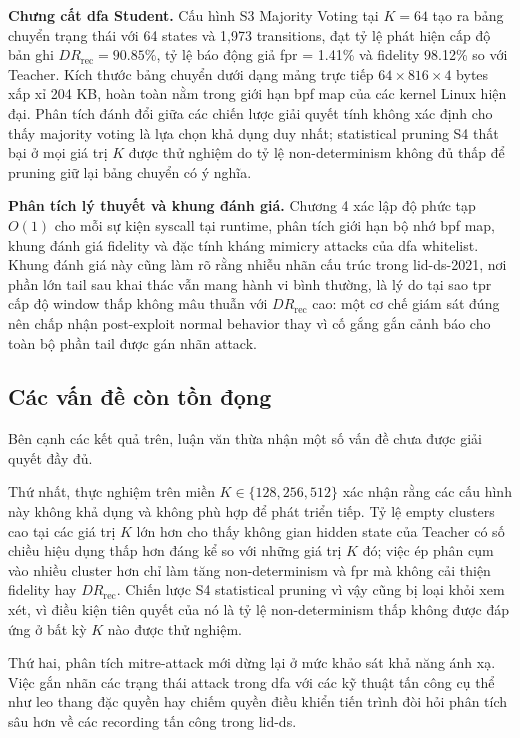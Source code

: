 \documentclass[../main.tex]{subfiles}
\begin{document}
\textbf{Chưng cất \gls{dfa} Student.} Cấu hình S3 Majority Voting tại $K = 64$ tạo ra bảng
chuyển trạng thái với 64 states và 1,973 transitions, đạt tỷ lệ phát hiện cấp độ bản ghi
$DR_{\text{rec}} = 90.85\%$, tỷ lệ báo động giả \gls{fpr} = 1.41\% và fidelity 98.12\% so với
Teacher. Kích thước bảng chuyển dưới dạng mảng trực tiếp $64 \times 816 \times 4$ bytes
xấp xỉ 204 KB, hoàn toàn nằm trong giới hạn \gls{bpf} map của các kernel Linux hiện đại.
Phân tích đánh đổi giữa các chiến lược giải quyết tính không xác định cho thấy majority
voting là lựa chọn khả dụng duy nhất; statistical pruning S4 thất bại ở mọi giá trị $K$
được thử nghiệm do tỷ lệ non-determinism không đủ thấp để pruning giữ lại bảng chuyển có
ý nghĩa.

\textbf{Phân tích lý thuyết và khung đánh giá.} Chương 4 xác lập độ phức tạp $O(1)$ cho
mỗi sự kiện \gls{syscall} tại runtime, phân tích giới hạn bộ nhớ \gls{bpf} map, khung đánh giá fidelity
và đặc tính kháng mimicry attacks của \gls{dfa} whitelist. Khung đánh giá này cũng làm rõ rằng
nhiễu nhãn cấu trúc trong \gls{lid-ds}-2021, nơi phần lớn tail sau khai thác vẫn mang hành vi
bình thường, là lý do tại sao \gls{tpr} cấp độ window thấp không mâu thuẫn với $DR_{\text{rec}}$
cao: một cơ chế giám sát đúng nên chấp nhận post-exploit normal behavior thay vì cố gắng
gắn cảnh báo cho toàn bộ phần tail được gán nhãn attack.

\subsection{Các vấn đề còn tồn đọng}

Bên cạnh các kết quả trên, luận văn thừa nhận một số vấn đề chưa được giải quyết đầy đủ.

Thứ nhất, thực nghiệm trên miền $K \in \{128, 256, 512\}$ xác nhận
rằng các cấu hình này không khả dụng và không phù hợp để phát triển
tiếp. Tỷ lệ empty clusters cao tại các giá trị $K$ lớn hơn cho thấy
không gian hidden state của Teacher có số chiều hiệu dụng thấp hơn
đáng kể so với những giá trị $K$ đó; việc ép phân cụm vào nhiều
cluster hơn chỉ làm tăng non-determinism và \gls{fpr} mà không cải thiện
fidelity hay $DR_{\text{rec}}$. Chiến lược S4 statistical pruning vì
vậy cũng bị loại khỏi xem xét, vì điều kiện tiên quyết của nó là tỷ
lệ non-determinism thấp không được đáp ứng ở bất kỳ $K$ nào được
thử nghiệm.

Thứ hai, phân tích \gls{mitre-attack} mới dừng lại ở mức khảo sát khả năng ánh xạ. Việc gắn
nhãn các trạng thái attack trong \gls{dfa} với các kỹ thuật tấn công cụ thể như leo thang đặc
quyền hay chiếm quyền điều khiển tiến trình đòi hỏi phân tích sâu hơn về các recording
tấn công trong \gls{lid-ds}.
\end{document}
